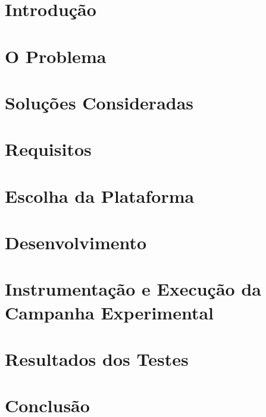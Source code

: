 \documentclass[english,brazil]{packages/icmc}
\begin{document}
\textual

\chapter{Introdução}
\label{chapter:introducao}


\chapter{O Problema}
\label{chapter:problema}


\chapter{Soluções Consideradas}
\label{chapter:solucoes-consideradas}


\chapter{Requisitos}
\label{chapter:requisitos}


\chapter{Escolha da Plataforma}
\label{chapter:framework}


\chapter{Desenvolvimento}
\label{chapter:desenvolvimento}


\chapter{Instrumentação e Execução da Campanha Experimental}
\label{chapter:metodos}


\chapter{Resultados dos Testes}
\label{chapter:resultados-testes}


\chapter{Conclusão}
\label{chapter:conclusao}

\end{document}
